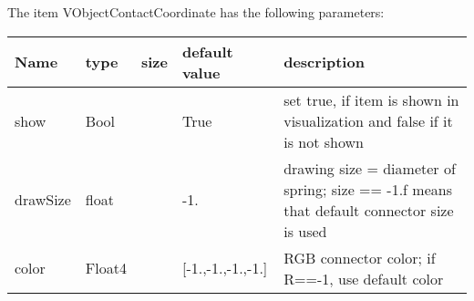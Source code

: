 The item VObjectContactCoordinate has the following parameters:
\begin{center}
  \footnotesize
  \begin{longtable}{| p{4.5cm} | p{2.5cm} | p{0.5cm} | p{2.5cm} | p{6cm} |}
    \hline
    \bf Name & \bf type & \bf size & \bf default value & \bf description \\ \hline
    show &     Bool &      &     True &     set true, if item is shown in visualization and false if it is not shown\\ \hline
    drawSize &     float &      &     -1. &     drawing size = diameter of spring; size == -1.f means that default connector size is used\\ \hline
    color &     Float4 &      &     [-1.,-1.,-1.,-1.] &     RGB connector color; if R==-1, use default color\\ \hline
	  \end{longtable}
	\end{center}

